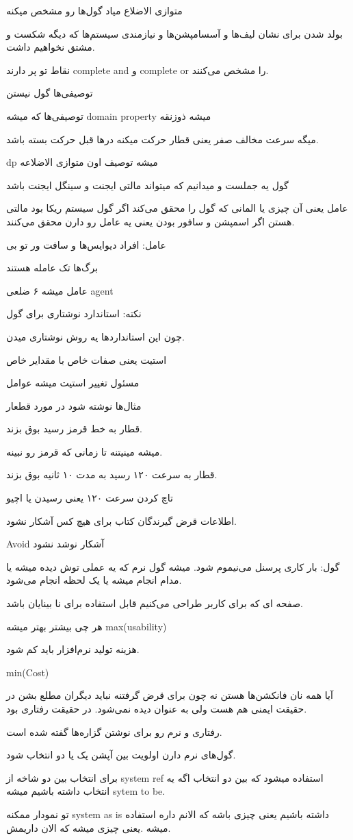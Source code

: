 متوازی الاضلاع میاد گول‌ها رو مشخص میکنه

بولد شدن برای نشان لیف‌ها و آسسامپشن‌ها و نیازمندی سیستم‌ها که دیگه شکست و مشتق
نخواهیم داشت.

نقاط تو پر دارند complete and و complete or را مشخص می‌کنند.

توصیفی‌ها گول نیستن

توصیفی‌ها که میشه domain property میشه ذوزنقه

میگه سرعت مخالف صفر یعنی قطار حرکت میکنه در‌ها قبل حرکت بسته باشد.

dp میشه توصیف اون متوازی الاضلاعه

گول یه جملست و میدانیم که میتواند مالتی ایجنت و سینگل ایجنت باشد

عامل یعنی آن چیزی یا المانی که گول را محقق می‌کند
اگر گول سیستم ریکا بود مالتی هستن
اگر اسمپشن و سافور بودن یعنی یه عامل رو دارن محقق می‌کنند.

عامل: افراد دیوایس‌ها و سافت ور تو بی

برگ‌ها تک عامله هستند 

عامل میشه ۶ ضلعی agent

نکته: استاندارد نوشتاری برای گول

چون این استاندارد‌ها یه روش نوشتاری میدن.

استیت یعنی صفات خاص با مقدایر خاص

مسئول تغییر استیت میشه عوامل

مثال‌ها نوشته شود در مورد قطعار

قطار به خط قرمز رسید بوق بزند.

میشه مینیتنه تا زمانی که قرمز رو نبینه.

قطار به سرعت ۱۲۰ رسید به مدت ۱۰ ثانیه بوق بزند.

تاچ کردن سرعت ۱۲۰ یعنی رسیدن یا اچیو

اطلاعات قرض گیرندگان کتاب برای هیچ کس آشکار نشود.

Avoid آشکار نوشد نشود

گول: بار کاری پرسنل می‌نیموم شود. 
میشه گول نرم
که یه عملی توش دیده میشه
یا مدام انجام میشه
یا یک لحظه انجام می‌شود.

صفحه ای که برای کاربر طراحی می‌کنیم قابل استفاده برای نا بینایان باشد.

هر چی بیشتر بهتر میشه max(usability)

هزینه تولید نرم‌افزار باید کم شود.

min(Cost)

آیا همه نان فانکشن‌ها هستن نه
چون برای قرض گرفتنه نباید دیگران مطلع بشن در حقیقت ایمنی هم هست ولی به عنوان
 دیده نمی‌شود. در حقیقت رفتاری بود.

رفتاری و نرم رو برای نوشتن گزاره‌ها گفته شده است.

گول‌های نرم دارن اولویت بین آپشن یک یا دو انتخاب شود.

برای انتخاب بین دو شاخه از system ref استفاده میشود که بین دو انتخاب اگه یه
انتخاب داشته باشیم میشه sytem to be.

تو نمودار ممکنه system as is داشته باشیم یعنی چیزی باشه که الانم داره استفاده
میشه .یعنی چیزی میشه که الان داریمش.


